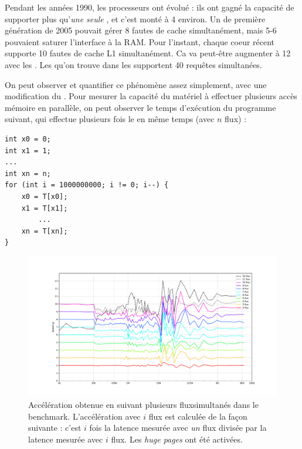 \begin{danger}
  Pendant les années 1990, les processeurs ont évolué : ils ont gagné la
  capacité de supporter plus qu'\emph{une seule} \og {}\fg, et c'est monté à 4 environ.  Un  de première
  génération de 2005 pouvait gérer 8 fautes de cache simultanément, mais 5-6
  pouvaient saturer l'interface à la RAM.  Pour l'instant, chaque coeur récent
  supporte 10 fautes de cache L1 simultanément. Ca va peut-être augmenter à 12 avec
  les .  Les  qu'on trouve dans
  les  supportent 40 requêtes simultanées.
\end{danger}

On peut observer et quantifier ce phénomène assez simplement, avec une
modification du . Pour mesurer la capacité du
matériel à effectuer plusieurs accès mémoire en parallèle, on peut observer le
temps d'exécution du programme suivant, qui effectue plusieurs fois le
 en même temps (avec $n$ \og flux\fg) :
\begin{myfilet}
\begin{verbatim}
int x0 = 0;
int x1 = 1;
...
int xn = n;
for (int i = 1000000000; i != 0; i--) {
	x0 = T[x0];
	x1 = T[x1];
        ...
	xn = T[xn];
}
\end{verbatim}
\end{myfilet}

\begin{figure}
  \includegraphics[width=\textwidth]{lane_curve.pdf}
  \caption{Accélération obtenue en suivant plusieurs \og flux\fg simultanés dans
    le  benchmark. L'accélération avec $i$ flux est
    calculée de la façon suivante : c'est $i$ fois la latence mesurée avec
    \emph{un} flux divisée par la latence mesurée avec $i$ flux. Les \emph{huge
      pages} ont été activées.\label{fig:pc-lanes}}
\end{figure}

